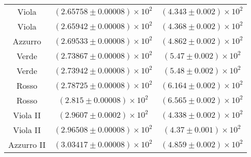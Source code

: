 \begin{tabular}{ccc}
\hline
 \hline
	Viola & $(2.65758\pm0.00008)\times 10^{2}$ & $(4.343\pm0.002)\times 10^{2}$ \\
	Viola & $(2.65942\pm0.00008)\times 10^{2}$ & $(4.368\pm0.002)\times 10^{2}$ \\
	Azzurro & $(2.69533\pm0.00008)\times 10^{2}$ & $(4.862\pm0.002)\times 10^{2}$ \\
	Verde & $(2.73867\pm0.00008)\times 10^{2}$ & $(5.47\pm0.002)\times 10^{2}$ \\
	Verde & $(2.73942\pm0.00008)\times 10^{2}$ & $(5.48\pm0.002)\times 10^{2}$ \\
	Rosso & $(2.78725\pm0.00008)\times 10^{2}$ & $(6.164\pm0.002)\times 10^{2}$ \\
	Rosso & $(2.815\pm0.00008)\times 10^{2}$ & $(6.565\pm0.002)\times 10^{2}$ \\
	Viola II & $(2.9607\pm0.0002)\times 10^{2}$ & $(4.338\pm0.002)\times 10^{2}$ \\
	Viola II & $(2.96508\pm0.00008)\times 10^{2}$ & $(4.37\pm0.001)\times 10^{2}$ \\
	Azzurro II & $(3.03417\pm0.00008)\times 10^{2}$ & $(4.859\pm0.002)\times 10^{2}$ \\
\hline
\end{tabular}
